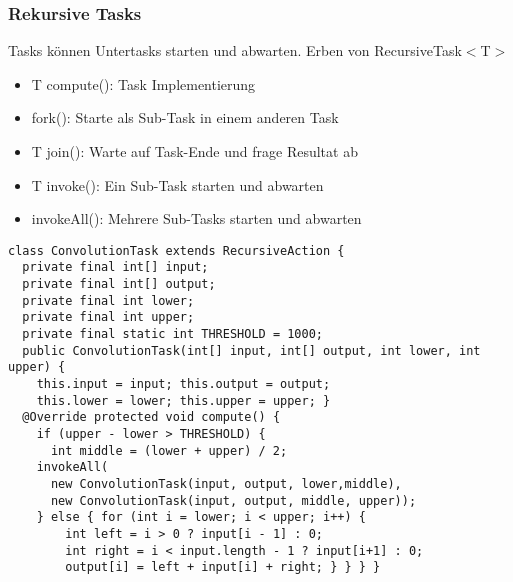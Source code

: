 \subsubsection{Rekursive Tasks}
Tasks können Untertasks starten und abwarten. Erben von RecursiveTask$<$T$>$
\begin{itemize}[topsep=0pt, leftmargin=3mm]
    \setlength\itemsep{-0.3em}
    \item T compute(): Task Implementierung
    \item fork(): Starte als Sub-Task in einem anderen Task
    \item T join(): Warte auf Task-Ende und frage Resultat ab
    \item T invoke(): Ein Sub-Task starten und abwarten
    \item invokeAll(): Mehrere Sub-Tasks starten und abwarten
\end{itemize}
\begin{lstlisting}
class ConvolutionTask extends RecursiveAction {
  private final int[] input;
  private final int[] output;
  private final int lower;
  private final int upper;
  private final static int THRESHOLD = 1000;
  public ConvolutionTask(int[] input, int[] output, int lower, int upper) {
    this.input = input; this.output = output;
    this.lower = lower; this.upper = upper; }
  @Override protected void compute() {
    if (upper - lower > THRESHOLD) {
      int middle = (lower + upper) / 2;
    invokeAll(
      new ConvolutionTask(input, output, lower,middle),
      new ConvolutionTask(input, output, middle, upper));
    } else { for (int i = lower; i < upper; i++) {
        int left = i > 0 ? input[i - 1] : 0;
        int right = i < input.length - 1 ? input[i+1] : 0;
        output[i] = left + input[i] + right; } } } }
\end{lstlisting}
